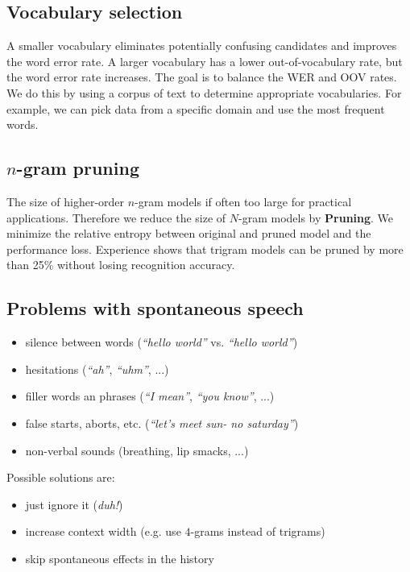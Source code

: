 \subsection{Vocabulary selection}
A smaller vocabulary eliminates potentially confusing candidates and improves the word error rate. A larger vocabulary has a lower out-of-vocabulary rate, but the word error rate increases. The goal is to balance the WER and OOV rates. We do this by using a corpus of text to determine appropriate vocabularies. For example, we can pick data from a specific domain and use the most frequent words.

\subsection{$n$-gram pruning}
The size of higher-order $n$-gram models if often too large for practical applications. Therefore we reduce the size of $N$-gram models by \textbf{Pruning}. We minimize the relative entropy between original and pruned model and the performance loss.
Experience shows that trigram models can be pruned by more than 25\% without losing recognition accuracy.

\subsection{Problems with spontaneous speech}
\begin{itemize}
    \item silence between words (\textit{``hello world''} vs. \textit{``hello \hspace{5pt} world''})
    \item hesitations (\textit{``ah''}, \textit{``uhm''}, ...)
    \item filler words an phrases (\textit{``I mean''}, \textit{``you know''}, ...)
    \item false starts, aborts, etc. (\textit{``let's meet sun- no saturday''})
    \item non-verbal sounds (breathing, lip smacks, ...)
\end{itemize}

Possible solutions are:
\begin{itemize}
    \item just ignore it (\textit{duh!})
    \item increase context width (e.g. use $4$-grams instead of trigrams)
    \item skip spontaneous effects in the history
\end{itemize}

